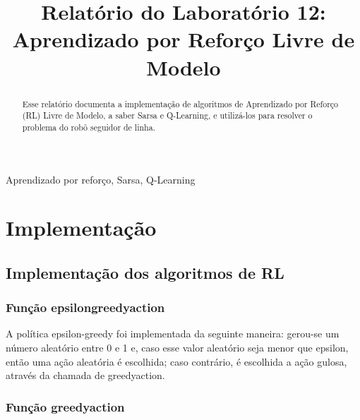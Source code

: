 \documentclass[conference]{IEEEtran}
\begin{document}
\title{Relatório do Laboratório 12: \\ Aprendizado por Reforço Livre de Modelo\\
}

\author{
}

\maketitle

\begin{abstract}
Esse relatório documenta a implementação de algoritmos de Aprendizado por Reforço (RL) Livre de Modelo, a saber Sarsa e Q-Learning, e utilizá-los para resolver o problema do robô seguidor de linha.
\end{abstract}

\begin{IEEEkeywords}
Aprendizado por reforço, Sarsa, Q-Learning
\end{IEEEkeywords}

\section{Implementação}

\subsection{Implementação dos algoritmos de RL}

\subsubsection{Função epsilon\underline{\space}greedy\underline{\space}action}

A política epsilon-greedy foi implementada da seguinte maneira: gerou-se um número aleatório entre 0 e 1 e, caso esse valor aleatório seja menor que epsilon, então uma ação aleatória é escolhida; caso contrário, é escolhida a ação gulosa, através da chamada de greedy\underline{\space}action. 

\subsubsection{Função greedy\underline{\space}action}
\end{document}
